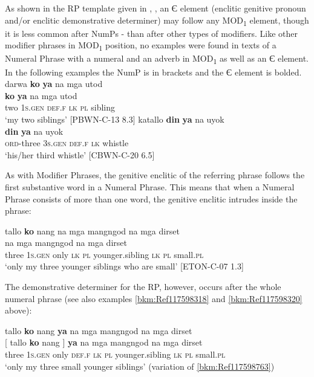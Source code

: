As shown in the RP template given in , , an {Є} element (enclitic genitive pronoun and/or enclitic demonstrative determiner) may follow any MOD\textsubscript{1} element, though it is less common after NumPs - than after other types of modifiers. Like other modifier phrases in MOD\textsubscript{1} position, no examples were found in texts of a Numeral Phrase with a numeral and an adverb in MOD\textsubscript{1} as well as an {Є} element. In the following examples the NumP is in brackets and the {Є} element is bolded.
\ea
\label{bkm:Ref342658638}
darwa  \textbf{ko}  \textbf{ya}  na  mga  utod \\\smallskip
 \gll [ darwa ]  \textbf{ko}  \textbf{ya}  na  mga  utod \\
{}  two  {}  1\textsc{s.gen}  \textsc{def.f}  \textsc{lk}  \textsc{pl}  sibling \\
\glt `my two siblings’ [PBWN-C-13 8.3]
\ex
\label{bkm:Ref343529548}
katallo  \textbf{din}  \textbf{ya}  na  uyok \\\smallskip
 \gll [ ka-tallo ]  \textbf{din}  \textbf{ya}  na  uyok \\
 {} \textsc{ord}-three {} 3\textsc{s.gen}  \textsc{def.f}  \textsc{lk}  whistle \\
\glt ‘his/her third whistle’ [CBWN-C-20 6.5]
\z

As with Modifier Phrases, the genitive enclitic of the referring phrase follows the first substantive word in a Numeral Phrase. This means that when a Numeral Phrase consists of more than one word, the genitive enclitic intrudes inside the phrase:

\ea
\label{bkm:Ref117598763}
tallo  \textbf{ko}   nang  na  mga  mangngod  na  mga  dirset \\\smallskip
   na  mga  mangngod  na  mga  dirset \\
 {} three  1\textsc{s.gen}  only {} \textsc{lk}  \textsc{pl}  younger.sibling  \textsc{lk}  \textsc{pl}  small.\textsc{pl} \\
\glt ‘only my three younger siblings who are small’ [ETON-C-07 1.3]
\z

The demonstrative determiner for the RP, however, occurs after the whole numeral phrase (see also examples \ref{bkm:Ref117598318} and \ref{bkm:Ref117598320} above):

\ea
tallo  \textbf{ko}   nang   \textbf{ya}    na  mga  mangngod  na  mga  dirset \\\smallskip
 \gll {}[ tallo  \textbf{ko}   nang ]  \textbf{ya}    na  mga  mangngod  na  mga  dirset \\
 {}  three  1\textsc{s.gen} only {} \textsc{def.f}  \textsc{lk}  \textsc{pl}  younger.sibling  \textsc{lk}  \textsc{pl}  small.\textsc{pl} \\
\glt ‘only my three small younger siblings’ (variation of \ref{bkm:Ref117598763})
\z

